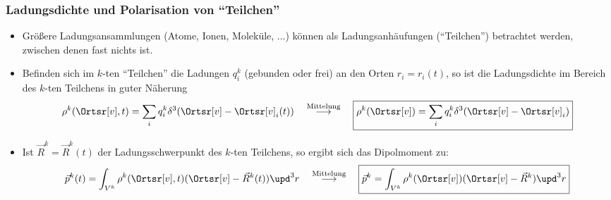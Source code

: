 \begin{frame}

  \frametitle{Ladungsdichte und Polarisation von \enquote{Teilchen}}
  \begin{itemize}[<+->]
  \item Größere Ladungsansammlungen (Atome, Ionen, Moleküle, ...) können als Ladungsanhäufungen (\enquote{Teilchen}) betrachtet werden, zwischen denen fast nichts ist.
  \item Befinden sich im $k$-ten \enquote{Teilchen} die Ladungen  $q_i^k$ (gebunden oder frei) an den Orten $r_i = r_i(t)$, so ist die \alert{Ladungsdichte im Bereich des $k$-ten Teilchens} in guter Näherung
    $$
    \rho^k(\Ortsr[v], t) = \sum_i q_i^k \delta^3(\Ortsr[v] - \Ortsr[v]_i(t) ) \quad \stackrel{\text{Mittelung}}{\longrightarrow} \quad \boxed{\rho^k(\Ortsr[v]) = \sum_i q_i^k \delta^3(\Ortsr[v] - \Ortsr[v]_i )} 
    $$
  \item Ist $\vec{R}^k=\vec{R}^k(t)$ der \alert{Ladungsschwerpunkt} des $k$-ten Teilchens, so ergibt sich das \alert{Dipolmoment} zu:
    $$
    \vec{p}^k(t) = \int_{V^k} \rho^k(\Ortsr[v], t) (\Ortsr[v] - \vec{R}^k(t) ) \upd^3r \quad \stackrel{\text{Mittelung}}{\longrightarrow} \quad \boxed{\vec{p}^k = \int_{V^k} \rho^k(\Ortsr[v]) (\Ortsr[v] - \vec{R}^k ) \upd^3r}
    $$
  \end{itemize}
  
  \end{frame}

